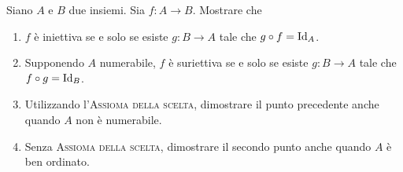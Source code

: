 \begin{es}
  Siano $ A $ e $ B $ due insiemi. Sia $ f \colon A \to B $. Mostrare che
  \begin{enumerate}
  \item $ f $ è iniettiva se e solo se esiste $ g \colon B \to A $ tale che $ g \circ f = \mathrm{Id}_A $.
  \item Supponendo $ A $ numerabile, $ f $ è suriettiva se e solo se esiste $ g \colon B \to A $ tale che $ f \circ g = \mathrm{Id}_B $.
  \item Utilizzando l'\textsc{Assioma della scelta}, dimostrare il punto precedente anche quando $ A $ non è numerabile.
  \item Senza \textsc{Assioma della scelta}, dimostrare il secondo punto anche quando $ A $ è ben ordinato.
  \end{enumerate}
\end{es}
